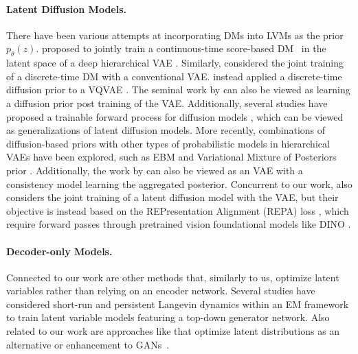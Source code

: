 \documentclass[twoside]{article}
\begin{document}
\paragraph{Latent Diffusion Models.}
There have been various attempts at incorporating \glspl*{DM} into \glspl*{LVM} as the prior $p_{\theta}(z)$. \citet{vahdatscorebasedgenerativemodeling2021} proposed to jointly train a continuous-time score-based \gls*{DM}~\citep{songscorebasedgenerativemodeling2021} in the latent space of a deep hierarchical \gls*{VAE} \citep{vahdatNVAEDeepHierarchical2020}. Similarly, \citet{wehenkeldiffusionpriorsvariational2021} considered the joint training of a discrete-time \gls*{DM} with a conventional \gls*{VAE}. \citet{cohen22vqdiff} instead applied a discrete-time diffusion prior to a \gls*{VQVAE} \citep{vandenoord17vqvae}. The seminal work by \citet{rombachhighresolutionimagesynthesis2022} can also be viewed as learning a diffusion prior post training of the \gls*{VAE}. Additionally, several studies have proposed a trainable forward process for diffusion models \citep{kim2022maximum, bartosh2024neural,bartosh2024flow,nielsen2024diffenc}, which can be viewed as generalizations of latent diffusion models.
More recently, combinations of diffusion-based priors with other types of probabilistic models in hierarchical \glspl*{VAE} have been explored, such as \gls*{EBM} \citep{cuiLearningLatentSpace2024} and Variational Mixture of Posteriors prior \citep{kuzina2024hierarchical}. Additionally, the work by \citet{silvestriTrainingConsistencyModels2025} can also be viewed as an \gls*{VAE} with a consistency model \citep{songConsistencyModels2023} learning the aggregated posterior. Concurrent to our work, \citet{leng2025repaeunlockingvaeendtoend} also considers the joint training of a latent diffusion model with the \gls*{VAE}, but their objective is instead based on the REPresentation Alignment (REPA) loss \citep{yuRepresentationAlignmentGeneration2024}, which require forward passes through pretrained vision foundational models like DINO \citep{caron2021emerging,oquab2024dinov2learningrobustvisual}.

\paragraph{Decoder-only Models.} 
Connected to our work are other methods that, similarly to us, optimize latent variables rather than relying on an encoder network. Several studies \citep{han2017abp, nijkamp2019shortrun,nijkamp2020inf,pangLearningLatentSpace2020,nijkamp2022mcmc,yu2023learning} have considered short-run and persistent Langevin dynamics within an \gls*{EM} framework to train latent variable models featuring a top-down generator network. Also related to our work are approaches like \citet{bojanowski2018optimizing,luiseGeneralizationPropertiesOptimal2020} that optimize latent distributions as an alternative or enhancement to \glspl*{GAN}~\citep{goodfellow2014generative}.
\end{document}
